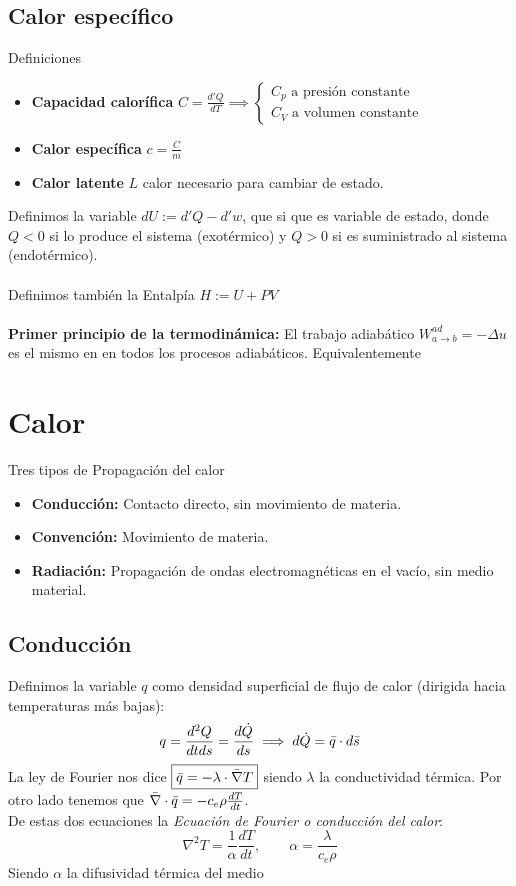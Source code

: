 \documentclass{myclass}
\begin{document}
\subsection{Calor específico}
Definiciones
\begin{itemize}
    \item \textbf{Capacidad calorífica} $C=\frac{d'Q}{dT} \implies \begin{cases}
    C_p \text{ a presión constante} \\
    C_V \text{ a volumen constante}
    \end{cases}$
    \item \textbf{Calor específica} $c=\frac{C}{m}$
    \item \textbf{Calor latente} $L$ calor necesario para cambiar de estado.
\end{itemize}

Definimos la variable $\boxed{dU := d'Q - d'w}$, que si que es variable de estado, donde $Q<0$ si lo produce el sistema (exotérmico) y $Q>0$ si es suministrado al sistema (endotérmico). \\
\\
Definimos también la Entalpía $\boxed{H:=U+PV}$ \\
\\
\textbf{Primer principio de la termodinámica:} El trabajo adiabático $\boxed{W^{ad}_{a\to b} = -\Delta u}$ es el mismo en en todos los procesos adiabáticos.
Equivalentemente 




\section{Calor}
Tres tipos de Propagación del calor
\begin{itemize}
    \item \textbf{Conducción:} Contacto directo, sin movimiento de materia.
    \item \textbf{Convención:} Movimiento de materia.
     \item \textbf{Radiación:} Propagación de ondas electromagnéticas en el vacío, sin medio material.
\end{itemize}
\subsection{Conducción}
Definimos la variable $q$ como densidad superficial de flujo de calor (dirigida hacia temperaturas más bajas):
$$
q = \frac{d^2Q}{dtds} = \frac{d\dot{Q}}{ds} \implies d\dot{Q} = \Bar{q}\cdot d\Bar{s}
$$
La ley de Fourier nos dice $\boxed{\Bar{q} = -\lambda \cdot \Bar{\nabla}T}$ siendo $\lambda$ la conductividad térmica. Por otro lado tenemos que $\Bar{\nabla}\cdot \Bar{q} = -c_e\rho\frac{dT}{dt}$. \\
De estas dos ecuaciones la \textit{Ecuación de Fourier o conducción del calor}:
$$
\boxed{\nabla^2T=\frac{1}{\alpha}\frac{dT}{dt}}, \qquad \alpha = \frac{\lambda}{c_e\rho}
$$
Siendo $\alpha$ la difusividad térmica del medio
\end{document}
